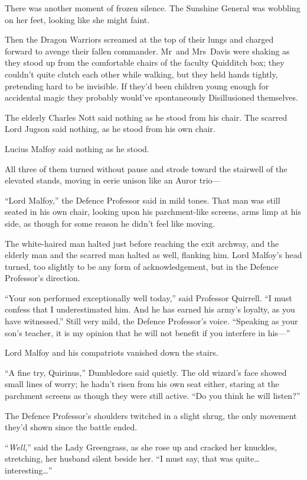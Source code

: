 There was another moment of frozen silence. The Sunshine General was wobbling
on her feet, looking like she might faint.

Then the Dragon Warriors screamed at the top of their lungs and charged forward
to avenge their fallen commander.
\later
Mr~and Mrs~Davis were shaking as they stood up from the comfortable chairs of
the faculty Quidditch box; they couldn’t quite clutch each other while walking,
but they held hands tightly, pretending hard to be invisible. If they’d been
children young enough for accidental magic they probably would’ve spontaneously
Disillusioned themselves.

The elderly Charles Nott said nothing as he stood from his chair. The scarred
Lord Jugson said nothing, as he stood from his own chair.

Lucius Malfoy said nothing as he stood.

All three of them turned without pause and strode toward the stairwell of the
elevated stands, moving in eerie unison like an Auror trio—

“Lord Malfoy,” the Defence Professor said in mild tones. That man was still
seated in his own chair, looking upon his parchment-like screens, arms limp at
his side, as though for some reason he didn’t feel like moving.

The white-haired man halted just before reaching the exit archway, and the
elderly man and the scarred man halted as well, flanking him. Lord Malfoy’s
head turned, too slightly to be any form of acknowledgement, but in the Defence
Professor’s direction.

“Your son performed exceptionally well today,” said Professor Quirrell. “I must
confess that I underestimated him. And he has earned his army’s loyalty, as you
have witnessed.” Still very mild, the Defence Professor’s voice. “Speaking as
your son’s teacher, it is my opinion that he will not benefit if you interfere
in his—”

Lord Malfoy and his compatriots vanished down the stairs.

“A fine try, Quirinus,” Dumbledore said quietly. The old wizard’s face showed
small lines of worry; he hadn’t risen from his own seat either, staring at the
parchment screens as though they were still active. “Do you think he will
listen?”

The Defence Professor’s shoulders twitched in a slight shrug, the only movement
they’d shown since the battle ended.

“\emph{Well},” said the Lady Greengrass, as she rose up and cracked her
knuckles, stretching, her husband silent beside her. “I must say, that was
quite…interesting…”

